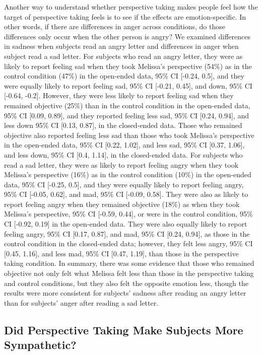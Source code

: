 \documentclass[man,a4paper,noextraspace,apacite]{apa6}\usepackage[]{graphicx}\usepackage[]{color}
\begin{document}
Another way to understand whether perspective taking makes people feel how the target of perspective taking feels is to see if the effects are emotion-specific. In other words, if there are differences in anger across conditions, do those differences only occur when the other person is angry? We examined differences in sadness when subjects read an angry letter and differences in anger when subject read a sad letter.
    For subjects who read an angry letter, they were as likely to report feeling sad when they took Melissa's perspective (54\%) as in the control condition (47\%) in the open-ended data, 95\% CI [-0.24, 0.5], and they were equally likely to report feeling sad, 95\% CI [-0.21, 0.45], and down, 95\% CI [-0.64, -0.2]. However, they were less likely to report feeling sad when they remained objective (25\%) than in the control condition in the open-ended data, 95\% CI [0.09, 0.89], and they reported feeling less sad, 95\% CI [0.24, 0.94], and less down 95\% CI [0.13, 0.87], in the closed-ended data. Those who remained objective also reported feeling less sad than those who took Melissa's perspective in the open-ended data, 95\% CI [0.22, 1.02], and less sad, 95\% CI [0.37, 1.06], and less down, 95\% CI [0.4, 1.14], in the closed-ended data.
    For subjects who read a sad letter, they were as likely to report feeling angry when they took Melissa's perspective (16\%) as in the control condition (10\%) in the open-ended data, 95\% CI [-0.25, 0.5], and they were equally likely to report feeling angry, 95\% CI [-0.05, 0.62], and mad, 95\% CI [-0.09, 0.58]. They were also as likely to report feeling angry when they remained objective (18\%) as when they took Melissa's perspective, 95\% CI [-0.59, 0.44], or were in the control condition, 95\% CI [-0.92, 0.19] in the open-ended data. They were also equally likely to report feeling angry, 95\% CI [0.17, 0.87], and mad, 95\% CI [0.24, 0.94], as those in the control condition in the closed-ended data; however, they felt less angry, 95\% CI [0.45, 1.16], and less mad, 95\% CI [0.47, 1.19], than those in the perspective taking condition.
    In summary, there was some evidence that those who remained objective not only felt what Melissa felt less than those in the perspective taking and control conditions, but they also felt the opposite emotion less, though the results were more consistent for subjects' sadness after reading an angry letter than for subjects' anger after reading a sad letter. 

\subsection{Did Perspective Taking Make Subjects More Sympathetic?}
\end{document}
